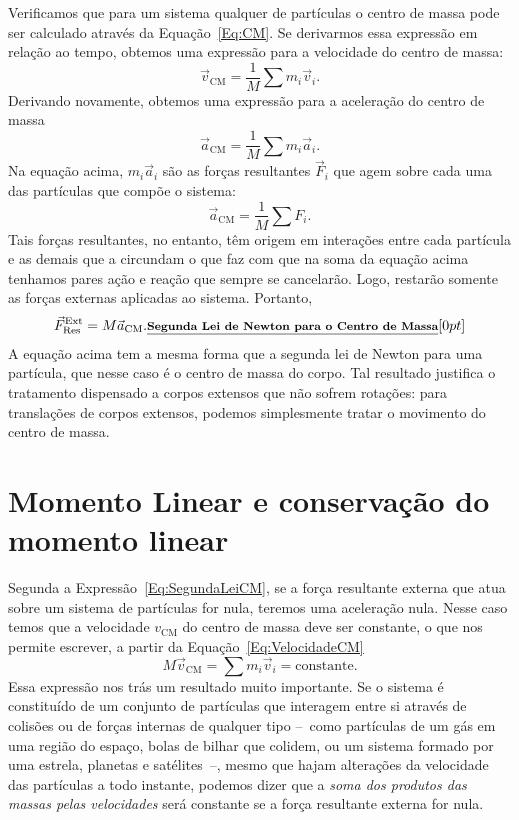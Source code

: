 Verificamos que para um sistema qualquer de partículas o centro de massa pode ser calculado através da Equação~\eqref{Eq:CM}. Se derivarmos essa expressão em relação ao tempo, obtemos uma expressão para a velocidade do centro de massa:
\begin{equation}\label{Eq:VelocidadeCM}
  \vec{v}_{\textrm{CM}} = \frac{1}{M} \sum m_i \vec{v}_i.
\end{equation}
%
Derivando novamente, obtemos uma expressão para a aceleração do centro de massa
\begin{equation}
  \vec{a}_{\textrm{CM}} = \frac{1}{M} \sum m_i \vec{a}_i.
\end{equation}
%
Na equação acima, $m_i \vec{a}_i$ são as forças resultantes $\vec{F}_i$ que agem sobre cada uma das partículas que compõe o sistema:
\begin{equation}
  \vec{a}_{\textrm{CM}} = \frac{1}{M} \sum F_i.
\end{equation}
%
Tais forças resultantes, no entanto, têm origem em interações entre cada partícula e as demais que a circundam o que faz com que na soma da equação acima tenhamos pares ação e reação que sempre se cancelarão. Logo, restarão somente as forças externas aplicadas ao sistema. Portanto,
\begin{equation}\label{Eq:SegundaLeiCM}
  \vec{F}_{\textrm{Res}}^{\textrm{Ext}} = M \vec{a}_{\textrm{CM}}. \relax{\footnotesize\emph{\textbf{Segunda Lei de Newton para o Centro de Massa}}}[0pt]
\end{equation}
%
A equação acima tem a mesma forma que a segunda lei de Newton para uma partícula, que nesse caso é o centro de massa do corpo. Tal resultado justifica o tratamento dispensado a corpos extensos que não sofrem rotações: para translações de corpos extensos, podemos simplesmente tratar o movimento do centro de massa.

\section{Momento Linear e conservação do momento linear}

Segunda a Expressão~\eqref{Eq:SegundaLeiCM}, se a força resultante externa que atua sobre um sistema de partículas for nula, teremos uma aceleração nula. Nesse caso temos que a velocidade $v_{\textrm{CM}}$ do centro de massa deve ser constante, o que nos permite escrever, a partir da Equação~\eqref{Eq:VelocidadeCM}
\begin{equation}
  M\vec{v}_{\textrm{CM}} = \sum m_i \vec{v}_i = \textrm{constante}.
\end{equation}
%
Essa expressão nos trás um resultado muito importante. Se o sistema é constituído de um conjunto de partículas que interagem entre si através de colisões ou de forças internas de qualquer tipo --~como partículas de um gás em uma região do espaço, bolas de bilhar que colidem, ou um sistema formado por uma estrela, planetas e satélites~--, mesmo que hajam alterações da velocidade das partículas a todo instante, podemos dizer que a \emph{soma dos produtos das massas pelas velocidades} será constante se a força resultante externa for nula.

